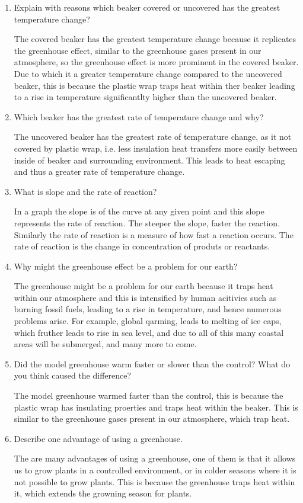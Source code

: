 \documentclass[a4paper, 12pt, english]{article}
\begin{document}
\begin{enumerate}
	\item Explain with reasons which beaker covered or uncovered has the greatest
	      temperature change?

	      The covered beaker has the greatest temperature change because it replicates
	      the greenhouse effect, similar to the greenhouse gases present in our
	      atmosphere, so the greenhouse effect is more prominent in the covered beaker.
	      Due to which it a greater temperature change compared to the uncovered beaker,
	      this is because the plastic wrap traps heat within ther beaker leading to a
	      rise in temperature significantlty higher than the uncovered beaker.
	\item Which beaker has the greatest rate of temperature change and why?

	      The uncovered beaker has the greatest rate of temperature change, as it not
	      covered by plastic wrap, i.e. less insulation heat transfers more easily
	      between inside of beaker and surrounding environment. This leads to heat
	      escaping and thus a greater rate of temperature change.
	\item What is slope and the rate of reaction?

	      In a graph the slope is of the curve at any given point and this slope
	      represents the rate of reaction. The steeper the slope, faster the reaction.
	      Similarly the rate of reaction is a measure of how fast a reaction occurs. The
	      rate of reaction is the change in concentration of produts or reactants.
	\item Why might the greenhouse effect be a problem for our earth?

	      The greenhouse might be a problem for our earth because it traps heat within
	      our atmosphere and this is intensified by human acitivies such as burning
	      fossil fuels, leading to a rise in temperature, and hence numerous problems
	      arise. For example, global qarming, leads to melting of ice caps, which fruther
	      leads to rise in sea level, and due to all of this many coastal areas will be
	      submerged, and many more to come.
	\item Did the model greenhouse warm faster or slower than the control? What do you
	      think caused the difference?
		  
		  The model greenhouse warmed faster than the
	      control, this is because the plastic wrap has insulating proerties and traps
	      heat within the beaker. This is similar to the greenhouse gases present in our
	      atmosphere, which trap heat.

	\item Describe one advantage of using a greenhouse.
	
	The are many advantages of using
	      a greenhouse, one of them is that it allows us to grow plants in a controlled
	      environment, or in colder seasons where it is not possible to grow plants. This
	      is because the greenhouse traps heat within it, which extends the growning
	      season for plants.
\end{enumerate}
\end{document}
